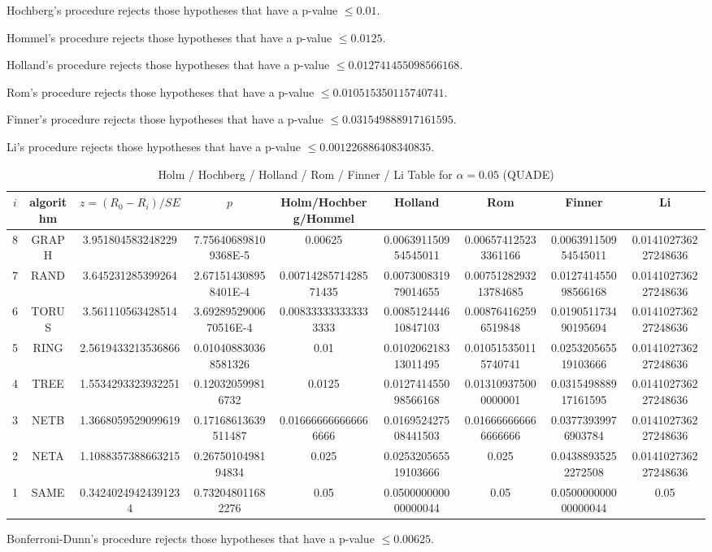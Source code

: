 \documentclass[a4paper,10pt]{article}
\begin{document}
\begin{landscape}
Hochberg's procedure rejects those hypotheses that have a p-value $\le0.01$.


Hommel's procedure rejects those hypotheses that have a p-value $\le0.0125$.


Holland's procedure rejects those hypotheses that have a p-value $\le0.012741455098566168$.


Rom's procedure rejects those hypotheses that have a p-value $\le0.010515350115740741$.


Finner's procedure rejects those hypotheses that have a p-value $\le0.031549888917161595$.


Li's procedure rejects those hypotheses that have a p-value $\le0.001226886408340835$.



\newpage

\begin{table}[!htp]
\centering\scriptsize
\caption{Holm / Hochberg / Holland / Rom / Finner / Li Table for $\alpha=0.05$ (QUADE)}
\begin{tabular}{ccccccccc}
$i$&algorithm&$z=(R_0 - R_i)/SE$&$p$&Holm/Hochberg/Hommel&Holland&Rom&Finner&Li\\
\hline
8& GRAPH&3.951804583248229&7.756406898109368E-5&0.00625&0.006391150954545011&0.006574125233361166&0.006391150954545011&0.014102736227248636\\
7& RAND&3.645231285399264&2.671514308958401E-4&0.0071428571428571435&0.007300831979014655&0.0075128293213784685&0.012741455098566168&0.014102736227248636\\
6& TORUS&3.561110563428514&3.6928952900670516E-4&0.008333333333333333&0.008512444610847103&0.008764162596519848&0.019051173490195694&0.014102736227248636\\
5& RING&2.5619433213536866&0.010408830368581326&0.01&0.010206218313011495&0.010515350115740741&0.025320565519103666&0.014102736227248636\\
4& TREE&1.5534293323932251&0.120320599816732&0.0125&0.012741455098566168&0.013109375000000001&0.031549888917161595&0.014102736227248636\\
3& NETB&1.3668059529099619&0.17168613639511487&0.016666666666666666&0.016952427508441503&0.016666666666666666&0.03773939976903784&0.014102736227248636\\
2& NETA&1.1088357388663215&0.2675010498194834&0.025&0.025320565519103666&0.025&0.04388935252272508&0.014102736227248636\\
1& SAME&0.34240249424391234&0.732048011682276&0.05&0.050000000000000044&0.05&0.050000000000000044&0.05\\
\hline
\end{tabular}
\end{table}
Bonferroni-Dunn's procedure rejects those hypotheses that have a p-value $\le0.00625$.



\end{landscape}
\end{document}
